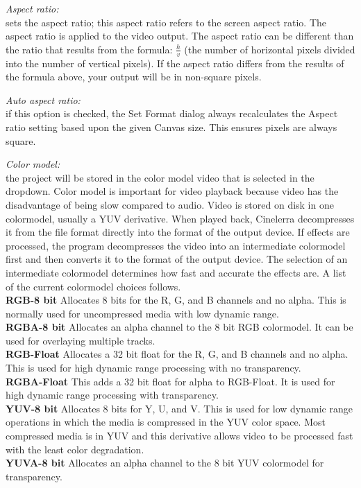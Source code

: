 \textit{Aspect ratio:}\\
sets the aspect ratio; this aspect ratio refers to the screen aspect ratio. The aspect ratio is applied to the video output. The aspect ratio can be different than the ratio that results from the formula: $\frac{h}{v}$ (the number of horizontal pixels divided into the number of vertical pixels). If the aspect ratio differs from the results of the formula above, your output will be in non-square pixels. 

\textit{Auto aspect ratio:}\\
if this option is checked, the Set Format dialog always recalculates the Aspect ratio setting based upon the given Canvas size. This ensures pixels are always square.

\textit{Color model:}\\
the project will be stored in the color model video that is selected in the dropdown.  Color model is important for video playback because video has the disadvantage of being slow compared to audio.  Video is stored on disk in one colormodel, usually a YUV derivative. When played back, Cinelerra decompresses it from the file format directly into the format of the output device. If effects are processed, the program decompresses the video into an intermediate colormodel first and then converts it to the format of the output device. The selection of an intermediate colormodel determines how fast and accurate the effects are.  A list of the current colormodel choices follows.\\
\textbf{RGB-8 bit} 
Allocates 8 bits for the R, G, and B channels and no alpha. This is normally used for uncompressed media with low dynamic range.\\
\textbf{RGBA-8 bit}
Allocates an alpha channel to the 8 bit RGB colormodel. It can be used for overlaying multiple tracks.\\
\textbf{RGB-Float}
Allocates a 32 bit float for the R, G, and B channels and no alpha. This is used  for high dynamic range processing with no transparency.\\
\textbf{RGBA-Float}
This adds a 32 bit float for alpha to RGB-Float. It is used for high dynamic range processing with transparency.\\
\textbf{YUV-8 bit}
Allocates 8 bits for Y, U, and V. This is used for low dynamic range operations in which the media is compressed in the YUV color space. Most compressed media is in YUV and this derivative allows video to be processed fast with the least color degradation.\\
\textbf{YUVA-8 bit}
Allocates an alpha channel to the 8 bit YUV colormodel for transparency.

